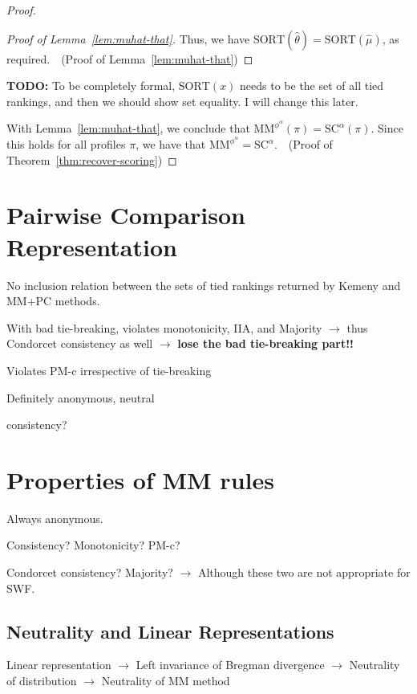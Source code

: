 \documentclass[10pt,letterpaper]{article}
\newcommand{\scr}{{\text{SC}}}
\newcommand{\mm}{\text{MM}}
\newcommand{\sca}{{\scr^{\alpha}}}
\newcommand{\sort}{\text{SORT}}
\newcommand{\phia}{\phi^{\alpha}}
\newcommand{\mmphia}{\mm^{\phia}}
\newcommand{\muhat}{\hat{\mu}}
\newcommand{\that}{\hat{\theta}}
\begin{document}
\begin{proof}
\begin{proof}[Proof of Lemma~\ref{lem:muhat-that}]
Thus, we have $\sort(\that) = \sort(\muhat)$, as required.~\qedhere~(Proof of Lemma~\ref{lem:muhat-that})
\end{proof}

{\bf TODO:} To be completely formal, $\sort(x)$ needs to be the set of all tied rankings, and then we should show set equality. I will change this later.

With Lemma~\ref{lem:muhat-that}, we conclude that $\mmphia(\pi) = \sca(\pi)$. Since this holds for all profiles $\pi$, we have that $\mmphia = \sca$.~\qedhere~(Proof of Theorem~\ref{thm:recover-scoring})
\end{proof}


\section{Pairwise Comparison Representation}
\label{sec:pc}

No inclusion relation between the sets of tied rankings returned by Kemeny and MM+PC methods. 

With bad tie-breaking, violates monotonicity, IIA, and Majority $\rightarrow$ thus Condorcet consistency as well $\rightarrow$ {\bf lose the bad tie-breaking part!!}

Violates PM-c irrespective of tie-breaking

Definitely anonymous, neutral

consistency? 


\section{Properties of MM rules}
\label{sec:properties}

Always anonymous.

Consistency? Monotonicity? PM-c? 

Condorcet consistency? Majority? $\rightarrow$ Although these two are not appropriate for SWF.

\subsection{Neutrality and Linear Representations}

Linear representation $\rightarrow$ Left invariance of Bregman divergence $\rightarrow$ Neutrality of distribution $\rightarrow$ Neutrality of MM method

\end{document}
